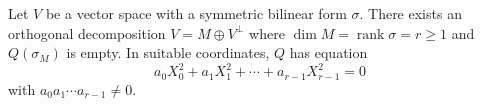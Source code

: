 Let $V$ be a vector space with a symmetric bilinear form $\sigma$. There exists an orthogonal decomposition $V = M \oplus V^\perp$ where $\dim M = \operatorname{rank} \sigma = r \geq 1$ and $Q(\sigma_M)$ is empty. In suitable coordinates, $Q$ has equation
$$a_0 X_0^2 + a_1 X_1^2 + \cdots + a_{r-1} X_{r-1}^2 = 0$$
with $a_0 a_1 \cdots a_{r-1} \neq 0$.
